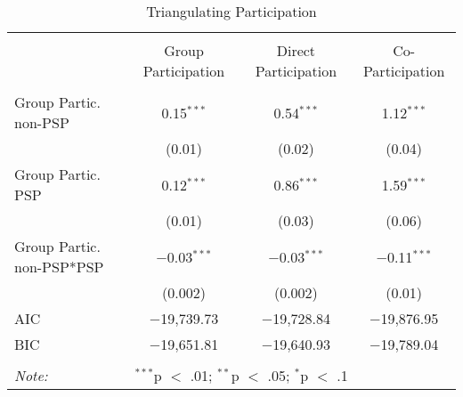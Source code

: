 
\begin{table}[!htbp] \centering 
  \caption{Triangulating Participation} 
  \label{table:partmods} 
\begin{tabular}{@{\extracolsep{5pt}}lccc} 
\\[-1.8ex]\hline \\[-1.8ex] 
 & Group Participation & Direct Participation & Co-Participation \\ 
\hline \\[-1.8ex] 
 Group Partic. non-PSP & 0.15$^{***}$ &0.54$^{***}$  & 1.12$^{***}$ \\ 
  & (0.01) &  (0.02) &  (0.04) \\ 
  Group Partic. PSP & 0.12$^{***}$ & 0.86$^{***}$ & 1.59$^{***}$ \\ 
  & (0.01) & (0.03) &  (0.06) \\ 
  Group Partic. non-PSP*PSP & $-$0.03$^{***}$ &$-$0.03$^{***}$  & $-$0.11$^{***}$ \\ 
  & (0.002) & (0.002)  &  (0.01)\\ 
 AIC & $-$19,739.73 & $-$19,728.84 & $-$19,876.95 \\ 
BIC & $-$19,651.81 & $-$19,640.93 & $-$19,789.04 \\ 
\hline \\[-1.8ex] 
\textit{Note:} & \multicolumn{3}{l}{$^{***}$p $<$ .01; $^{**}$p $<$ .05; $^{*}$p $<$ .1} \\ 
\end{tabular} 
\end{table} 
